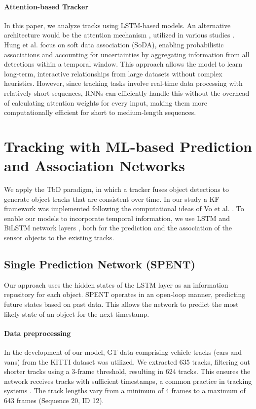 \documentclass[letterpaper, 10 pt, journal, twoside]{IEEEtran}
\begin{document}
\paragraph{Attention-based Tracker}
In this paper, we analyze tracks using \ac{LSTM}-based models.
An alternative architecture would be the attention mechanism {\cite{ML_Attention.2017}}, utilized in various studies {\cite{DL_CNN_ATT_mot.2017,DL_ATT_CNN_soda.2020,DL_CNN_ATT_mot.2017,DL_ATT_Trackformer.2022,Carion2020EndtoEndOD}}.
Hung et al. {\cite{DL_ATT_CNN_soda.2020}} focus on soft data association (SoDA), enabling probabilistic associations and accounting for uncertainties by aggregating information from all detections within a temporal window.
This approach allows the model to learn long-term, interactive relationships from large datasets without complex heuristics.
However, since tracking tasks involve real-time data processing with relatively short sequences, \acp{RNN} can efficiently handle this without the overhead of calculating attention weights for every input, making them more computationally efficient for short to medium-length sequences.

\section{Tracking with \ac{ML}-based Prediction and Association Networks}
We apply the \ac{TbD} paradigm, in which a tracker fuses object detections to generate object tracks that are consistent over time. In our study a \ac{KF} framework was implemented following the computational ideas of Vo et al. {\cite{KF_framework.2013}}.
To enable our models to incorporate temporal information, we use \ac{LSTM} {\cite{DL_LSTM.1997}} and BiLSTM network layers {\cite{DL_BILSTM.1997}}, both for the prediction and the association of the sensor objects to the existing tracks.

\subsection{Single Prediction Network (SPENT)}
\label{sec::spent}
Our approach uses the hidden states of the \ac{LSTM} layer as an information repository for each object. {\ac{SPENT}} operates in an open-loop manner, predicting future states based on past data.
This allows the network to predict the most likely state of an object for the next timestamp.

\paragraph{Data preprocessing}
In the development of our model, \ac{GT} data comprising vehicle tracks (cars and vans) from the KITTI dataset {\cite{Geiger2012CVPR}} was utilized.
We extracted 635 tracks, filtering out shorter tracks using a 3-frame threshold, resulting in 624 tracks.
This ensures the network receives tracks with sufficient timestamps, a common practice in tracking systems \cite{DL_DetTrack.2024}.
The track lengths vary from a minimum of 4 frames to a maximum of 643 frames (Sequence 20, ID 12).
\end{document}

